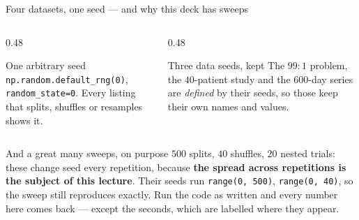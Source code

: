 \documentclass[aspectratio=169]{beamer}
\begin{document}
\begin{frame}[shrink=6]{Four datasets, one seed --- and why this deck has sweeps}
  \begin{columns}[T]
    \begin{column}{0.48\textwidth}
      \begin{block}{One arbitrary seed}
        \small \texttt{np.random.default\_rng(0)},
        \texttt{random\_state=0}. Every listing that splits, shuffles or
        resamples shows it.
      \end{block}
    \end{column}
    \begin{column}{0.48\textwidth}
      \begin{block}{Three data seeds, kept}
        \small The $99{:}1$ problem, the $40$-patient study and the
        $600$-day series are \emph{defined} by their seeds, so those keep
        their own names and values.
      \end{block}
    \end{column}
  \end{columns}
  \begin{alertblock}{And a great many sweeps, on purpose}
    \small $500$ splits, $40$ shuffles, $20$ nested trials: these change seed
    every repetition, because \textbf{the spread across repetitions is the
    subject of this lecture}. Their seeds run \texttt{range(0, 500)},
    \texttt{range(0, 40)}, so the sweep still reproduces exactly. Run the code
    as written and every number here comes back --- except the seconds, which
    are labelled where they appear.
  \end{alertblock}
\end{frame}
\end{document}
